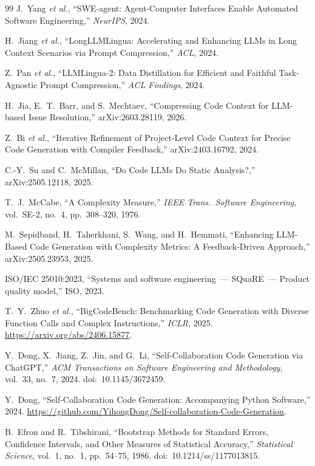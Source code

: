 \begin{thebibliography}{99}
J.~Yang \emph{et al.}, ``SWE-agent: Agent-Computer Interfaces Enable Automated Software Engineering,'' \emph{NeurIPS}, 2024.

H.~Jiang \emph{et al.}, ``LongLLMLingua: Accelerating and Enhancing LLMs in Long Context Scenarios via Prompt Compression,'' \emph{ACL}, 2024.

Z.~Pan \emph{et al.}, ``LLMLingua-2: Data Distillation for Efficient and Faithful Task-Agnostic Prompt Compression,'' \emph{ACL Findings}, 2024.

H.~Jia, E.~T.~Barr, and S.~Mechtaev, ``Compressing Code Context for LLM-based Issue Resolution,'' arXiv:2603.28119, 2026.

Z.~Bi \emph{et al.}, ``Iterative Refinement of Project-Level Code Context for Precise Code Generation with Compiler Feedback,'' arXiv:2403.16792, 2024.

C.-Y.~Su and C.~McMillan, ``Do Code LLMs Do Static Analysis?,'' arXiv:2505.12118, 2025.

T.~J.~McCabe, ``A Complexity Measure,'' \emph{IEEE Trans.\ Software Engineering}, vol.~SE-2, no.~4, pp.~308--320, 1976.

M.~Sepidband, H.~Taherkhani, S.~Wang, and H.~Hemmati, ``Enhancing LLM-Based Code Generation with Complexity Metrics: A Feedback-Driven Approach,'' arXiv:2505.23953, 2025.

ISO/IEC 25010:2023, ``Systems and software engineering~--- SQuaRE~--- Product quality model,'' ISO, 2023.

T.~Y.~Zhuo \emph{et al.}, ``BigCodeBench: Benchmarking Code Generation with Diverse Function Calls and Complex Instructions,'' \emph{ICLR}, 2025. \url{https://arxiv.org/abs/2406.15877}.

Y.~Dong, X.~Jiang, Z.~Jin, and G.~Li, ``Self-Collaboration Code Generation via ChatGPT,'' \emph{ACM Transactions on Software Engineering and Methodology}, vol.~33, no.~7, 2024. doi:~10.1145/3672459.

Y.~Dong, ``Self-Collaboration Code Generation: Accompanying Python Software,'' 2024. \url{https://github.com/YihongDong/Self-collaboration-Code-Generation}.

B.~Efron and R.~Tibshirani, ``Bootstrap Methods for Standard Errors, Confidence Intervals, and Other Measures of Statistical Accuracy,'' \emph{Statistical Science}, vol.~1, no.~1, pp.~54--75, 1986. doi:~10.1214/ss/1177013815.


\end{thebibliography}
